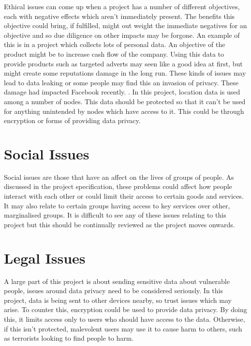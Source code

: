 \documentclass{report}
\begin{document}
Ethical issues can come up when a project has a number of different objectives, each with negative effects which aren't immediately present. The benefits this objective could bring, if fulfilled, might out weight the immediate negatives for an objective and so due diligence on other impacts may be forgone. An example of this is in a project which collects lots of personal data. An objective of the product might be to increase cash flow of the company. Using this data to provide products such as targeted adverts may seen like a good idea at first, but might create some reputations damage in the long run. These kinds of issues may lead to data leaking or some people may find this an invasion of privacy. These damage had impacted Facebook recently. \cite{fbbreak}. In this project, location data is used among a number of nodes. This data should be protected so that it can't be used for anything unintended by nodes which have access to it. This could be through encryption or forms of providing data privacy. 

\section{Social Issues}

Social issues are those that have an affect on the lives of groups of people. As discussed in the project specification, these problems could affect how people interact with each other or could limit their access to certain goods and services. It may also relate to certain groups having access to key services over other, marginalised groups. It is difficult to see any of these issues relating to this project but this should be continually reviewed as the project moves onwards. 

\section{Legal Issues}

A large part of this project is about sending sensitive data about vulnerable people, issues around data privacy need to be considered seriously. In this project, data is being sent to other devices nearby, so trust issues which may arise. To counter this, encryption could be used to provide data privacy. By doing this, it limits access only to users who should have access to the data. Otherwise, if this isn't protected, malevolent users may use it to cause harm to others, such as terrorists looking to find people to harm. 
\end{document}

